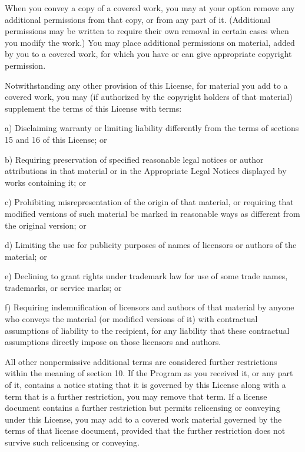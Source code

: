 \documentclass[letterpaper,10pt,english]{sphinxmanual}
\begin{document}
\begin{sphinxVerbatim}[commandchars=\\\{\}]
  When you convey a copy of a covered work, you may at your option
remove any additional permissions from that copy, or from any part of
it.  (Additional permissions may be written to require their own
removal in certain cases when you modify the work.)  You may place
additional permissions on material, added by you to a covered work,
for which you have or can give appropriate copyright permission.

  Notwithstanding any other provision of this License, for material you
add to a covered work, you may (if authorized by the copyright holders of
that material) supplement the terms of this License with terms:

    a) Disclaiming warranty or limiting liability differently from the
    terms of sections 15 and 16 of this License; or

    b) Requiring preservation of specified reasonable legal notices or
    author attributions in that material or in the Appropriate Legal
    Notices displayed by works containing it; or

    c) Prohibiting misrepresentation of the origin of that material, or
    requiring that modified versions of such material be marked in
    reasonable ways as different from the original version; or

    d) Limiting the use for publicity purposes of names of licensors or
    authors of the material; or

    e) Declining to grant rights under trademark law for use of some
    trade names, trademarks, or service marks; or

    f) Requiring indemnification of licensors and authors of that
    material by anyone who conveys the material (or modified versions of
    it) with contractual assumptions of liability to the recipient, for
    any liability that these contractual assumptions directly impose on
    those licensors and authors.

  All other non\PYGZhy{}permissive additional terms are considered \PYGZdq{}further
restrictions\PYGZdq{} within the meaning of section 10.  If the Program as you
received it, or any part of it, contains a notice stating that it is
governed by this License along with a term that is a further
restriction, you may remove that term.  If a license document contains
a further restriction but permits relicensing or conveying under this
License, you may add to a covered work material governed by the terms
of that license document, provided that the further restriction does
not survive such relicensing or conveying.


\end{sphinxVerbatim}
\end{document}
